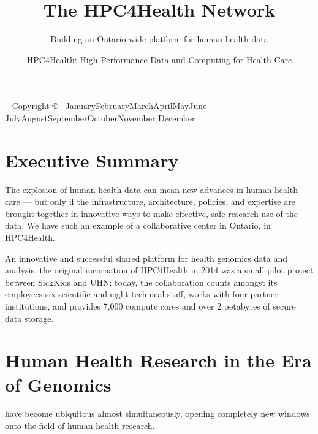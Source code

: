 \documentclass[twoside,symmetric,sfsidenotes,notoc]{tufte-book}
\title{The HPC4Health Network}
\subtitle{Building an Ontario-wide platform for human health data}
\author{HPC4Health: High-Performance Data and Computing for Health Care}
\newcommand{\monthyear}{%
  \ifcase\month\or January\or February\or March\or April\or May\or June\or
  July\or August\or September\or October\or November\or
  December\fi\space\number\year
}
\begin{document}
\frontmatter

\maketitle


\newpage
\begin{fullwidth}
~\vfill
\thispagestyle{empty}
\setlength{\parindent}{0pt}
\setlength{\parskip}{\baselineskip}
Copyright \copyright\ \monthyear
\par{}
\par{}
\end{fullwidth}

\cleardoublepage
\chapter*{Executive Summary}

\begin{fullwidth}
The explosion of human health data can mean new advances in human health care ---
but only if the infrastructure, architecture, policies, and expertise are brought
together in innovative ways to make effective, safe research use of the data.
We have such an example of a collaborative center in Ontario, in HPC4Health.

An innovative and successful shared platform for health genomics data and analysis,
the original incarnation of HPC4Health in 2014 was a small pilot project between
SickKids and UHN; today, the collaboration counts amongst its employees six scientific 
and eight technical staff, works with four partner institutions, and provides 7,000
compute cores and over 2 petabytes of secure data storage.
\end{fullwidth}

\mainmatter

\chapter{Human Health Research in the Era of Genomics}
\label{ch:health-data-at-scale}

 have 
become ubiquitous almost simultaneously, opening completely new windows onto the field
of human health research.  
\end{document}
